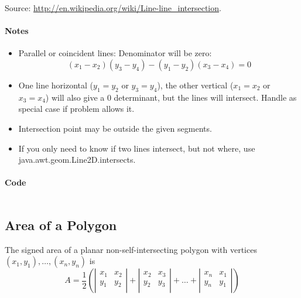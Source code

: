 Source: \href{http://en.wikipedia.org/wiki/Line-line_intersection}{http://en.wikipedia.org/wiki/Line-line\_intersection}.

\paragraph{Notes}
\begin{itemize}
\item Parallel or coincident lines:
    Denominator will be zero:
    \[
        (x_1 - x_2) (y_3 - y_4) - (y_1 - y_2) (x_3 - x_4) = 0
    \]
\item One line horizontal ($y_1 = y_2$ or $y_3 = y_4$), the other vertical ($x_1 = x_2$ or $x_3 = x_4$) will also
    give a 0 determinant, but the lines will intersect.  Handle as special case if problem allows it.

\item Intersection point may be outside the given segments.

\item If you only need to know if two lines intersect, but not where, use java.awt.geom.Line2D.intersects.
\end{itemize}

\paragraph{Code}

\inputminted{java}{code/lineintersection.java}

%
%
%

\subsection{Area of a Polygon}

The signed area of a planar non-self-intersecting polygon with vertices $(x_1, y_1), \dots, (x_n, y_n)$ is
\[
    A = \frac{1}{2} \left(
        \left\vert
        \begin{array}{cc}
            x_1 & x_2 \\
            y_1 & y_2 \\
        \end{array}
        \right\vert
        +
        \left\vert
        \begin{array}{cc}
            x_2 & x_3 \\
            y_2 & y_3 \\
        \end{array}
        \right\vert
        + \ldots +
        \left\vert
        \begin{array}{cc}
            x_n & x_1 \\
            y_n & y_1 \\
        \end{array}
        \right\vert
        \right)
\]

